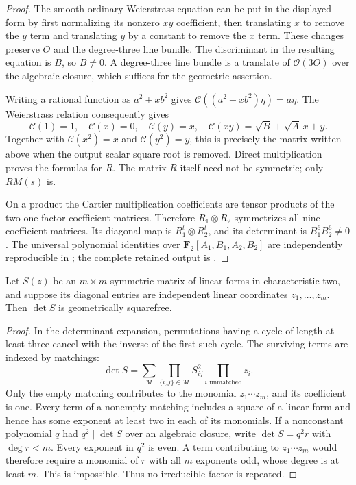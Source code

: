 \begin{proof}
The smooth ordinary Weierstrass equation can be put in the
displayed form by first normalizing its nonzero $xy$
coefficient, then translating $x$ to remove the $y$ term and
translating $y$ by a constant to remove the $x$ term.
These changes preserve $O$ and the degree-three line bundle.
The discriminant in the resulting equation is $B$, so $B\ne0$.
A degree-three line bundle is a translate of $\mathcal O(3O)$
over the algebraic closure, which suffices for the geometric
assertion.

Writing a rational function as $a^2+x b^2$ gives
$\mathcal C((a^2+x b^2)\eta)=a\eta$.
The Weierstrass relation consequently gives
\[
 \mathcal C(1)=1,\quad \mathcal C(x)=0,\quad
 \mathcal C(y)=x,\quad
 \mathcal C(xy)=\sqrt B+\sqrt A\,x+y.
\]
Together with $\mathcal C(x^2)=x$ and
$\mathcal C(y^2)=y$, this is precisely the matrix written above
when the output scalar square root is removed.
Direct multiplication proves the formulas for $R$.
The matrix $R$ itself need not be symmetric; only $RM(s)$ is.

On a product the Cartier multiplication coefficients are tensor
products of the two one-factor coefficient matrices. Therefore
$R_1\otimes R_2$ symmetrizes all nine coefficient matrices.
Its diagonal map is $R_1^t\otimes R_2^t$, and its determinant
is $B_1^6B_2^6\ne0$.
The universal polynomial identities over
$\mathbf F_2[A_1,B_1,A_2,B_2]$ are independently reproducible in
;
the complete retained output is
.
\end{proof}

\begin{lemma}
\label{lem:symmetric-independent-diagonal-squarefree}
Let $S(z)$ be an $m\times m$ symmetric matrix of linear forms
in characteristic two, and suppose its diagonal entries are
independent linear coordinates $z_1,\ldots,z_m$.
Then $\det S$ is geometrically squarefree.
\end{lemma}

\begin{proof}
In the determinant expansion, permutations having a cycle of
length at least three cancel with the inverse of the first such
cycle. The surviving terms are indexed by matchings:
\[
 \det S=\sum_{\mathcal M}
 \prod_{\{i,j\}\in\mathcal M}S_{ij}^2
 \prod_{i\text{ unmatched}}z_i.
\]
Only the empty matching contributes to the monomial
$z_1\cdots z_m$, and its coefficient is one. Every term of a
nonempty matching includes a square of a linear form and hence
has some exponent at least two in each of its monomials.
If a nonconstant polynomial $q$ had $q^2\mid\det S$ over an
algebraic closure, write $\det S=q^2r$ with $\deg r<m$.
Every exponent in $q^2$ is even. A term contributing to
$z_1\cdots z_m$ would therefore require a monomial of $r$
with all $m$ exponents odd, whose degree is at least $m$.
This is impossible. Thus no irreducible factor is repeated.
\end{proof}

